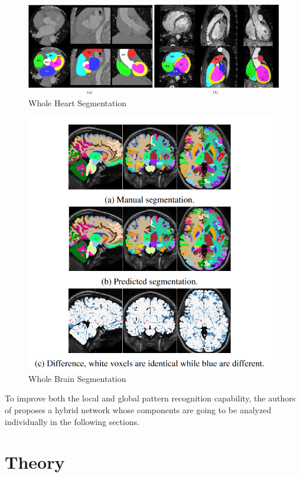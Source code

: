 \documentclass{IEEEtran}
\begin{document}
\begin{figure}[h]
    \centering
    \includegraphics[width=\textwidth]{img/heartseg1.jpg}
    \caption{Whole Heart Segmentation \cite{ZHUANG2019101537}}\label{fig:heartseg}
    \end{figure}

\begin{figure}[h]
    \centering
    \includegraphics[width=\textwidth]{img/brainseg.png}
    \caption{Whole Brain Segmentation \cite{de2015deep}}\label{fig:brainseg}
    \end{figure}


To improve both the local and global pattern recognition capability, the authors of \cite{chen2021transunet} proposes a hybrid network whose components are going to be analyzed individually in the following sections. 

\section{Theory}
\end{document}
